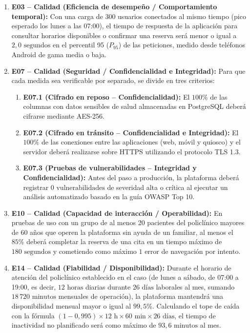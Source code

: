 \documentclass[10pt,a4paper]{article}
\begin{document}
\begin{enumerate}
    \item \textbf{E03 -- Calidad (Eficiencia de desempe\~no / Comportamiento temporal):}
    Con una carga de 300 usuarios conectados al mismo tiempo (pico esperado los lunes a las 07:00), el tiempo de respuesta de la aplicaci\'on para consultar horarios disponibles o confirmar una reserva ser\'a menor o igual a $2{,}0\text{ segundos}$ en el percentil 95 ($P_{95}$) de las peticiones, medido desde tel\'efonos Android de gama media o baja.

    \item \textbf{E07 -- Calidad (Seguridad / Confidencialidad e Integridad):}
    Para que cada medida sea verificable por separado, se divide en tres criterios:
    \begin{enumerate}
        \item \textbf{E07.1 (Cifrado en reposo -- Confidencialidad):} El $100\%$ de las columnas con datos sensibles de salud almacenadas en PostgreSQL deber\'a cifrarse mediante AES-256.
        \item \textbf{E07.2 (Cifrado en tr\'ansito -- Confidencialidad e Integridad):} El $100\%$ de las conexiones entre las aplicaciones (web, m\'ovil y quiosco) y el servidor deber\'a realizarse sobre HTTPS utilizando el protocolo TLS 1.3.
        \item \textbf{E07.3 (Pruebas de vulnerabilidades -- Integridad y Confidencialidad):} Antes del paso a producci\'on, la plataforma deber\'a registrar $0\text{ vulnerabilidades}$ de severidad alta o cr\'itica al ejecutar un an\'alisis automatizado basado en la gu\'ia OWASP Top 10.
    \end{enumerate}

    \item \textbf{E10 -- Calidad (Capacidad de interacci\'on / Operabilidad):}
    En pruebas de uso con un grupo de al menos 20 pacientes del policl\'inico mayores de 60 a\~nos que operen la plataforma sin ayuda de un familiar, al menos el $85\%$ deber\'a completar la reserva de una cita en un tiempo m\'aximo de $180\text{ segundos}$ y cometiendo como m\'aximo $1\text{ error}$ de navegaci\'on por intento.

    \item \textbf{E14 -- Calidad (Fiabilidad / Disponibilidad):}
    Durante el horario de atenci\'on del policl\'inico establecido en el caso (de lunes a s\'abado, de 07:00 a 19:00, es decir, $12\text{ horas}$ diarias durante $26\text{ d\'ias}$ laborales al mes, sumando $18\,720\text{ minutos}$ mensuales de operaci\'on), la plataforma mantendr\'a una disponibilidad mensual mayor o igual al $99{,}5\%$. Calculando el tope de ca\'ida con la f\'ormula $(1 - 0{,}995) \times 12\text{ h} \times 60\text{ min} \times 26\text{ d\'ias}$, el tiempo de inactividad no planificado ser\'a como m\'aximo de $93{,}6\text{ minutos}$ al mes.


\end{enumerate}
\end{document}
